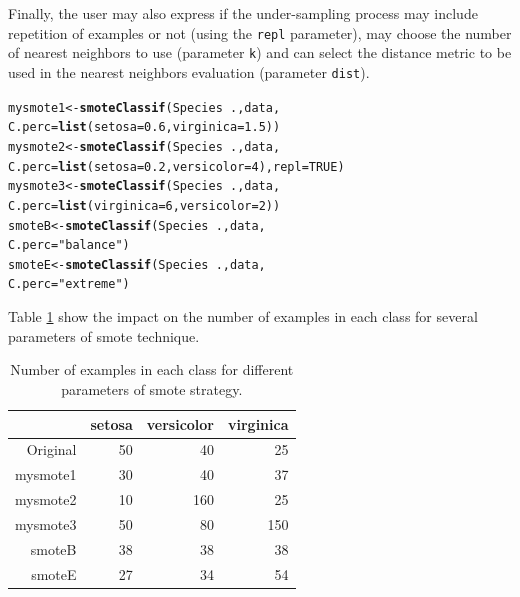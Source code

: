 \documentclass[10pt,a4paper]{article}\usepackage[]{graphicx}\usepackage[]{color}
\makeatletter
\newcommand{\hlnum}[1]{\textcolor[rgb]{0.686,0.059,0.569}{#1}}%
\newcommand{\hlstr}[1]{\textcolor[rgb]{0.192,0.494,0.8}{#1}}%
\newcommand{\hlopt}[1]{\textcolor[rgb]{0,0,0}{#1}}%
\newcommand{\hlstd}[1]{\textcolor[rgb]{0.345,0.345,0.345}{#1}}%
\newcommand{\hlkwb}[1]{\textcolor[rgb]{0.69,0.353,0.396}{#1}}%
\newcommand{\hlkwc}[1]{\textcolor[rgb]{0.333,0.667,0.333}{#1}}%
\newcommand{\hlkwd}[1]{\textcolor[rgb]{0.737,0.353,0.396}{\textbf{#1}}}%
\newenvironment{kframe}{%
 \def\at@end@of@kframe{}%
 \ifinner\ifhmode%
  \def\at@end@of@kframe{\end{minipage}}%
  \begin{minipage}{\columnwidth}%
 \fi\fi%
 \def\FrameCommand##1{\hskip\@totalleftmargin \hskip-\fboxsep
 \colorbox{shadecolor}{##1}\hskip-\fboxsep
     \hskip-\linewidth \hskip-\@totalleftmargin \hskip\columnwidth}%
 \MakeFramed {\advance\hsize-\width
   \@totalleftmargin\z@ \linewidth\hsize
   \@setminipage}}%
 {\par\unskip\endMakeFramed%
 \at@end@of@kframe}
\newenvironment{knitrout}{}{} %
\makeatother
\begin{document}
Finally, the user may also express if the under-sampling process may include repetition of examples or not (using the \texttt{repl} parameter), may choose the number of nearest neighbors to use (parameter \texttt{k}) and can select the distance metric to be used in the nearest neighbors evaluation (parameter \texttt{dist}). 


\begin{knitrout}\footnotesize
{}\color{fgcolor}\begin{kframe}
\begin{alltt}
  \hlstd{mysmote1} \hlkwb{<-} \hlkwd{smoteClassif}\hlstd{(Species}\hlopt{~}\hlstd{., data,}
                           \hlkwc{C.perc}\hlstd{=}\hlkwd{list}\hlstd{(}\hlkwc{setosa}\hlstd{=}\hlnum{0.6}\hlstd{,} \hlkwc{virginica}\hlstd{=}\hlnum{1.5}\hlstd{))}
  \hlstd{mysmote2} \hlkwb{<-} \hlkwd{smoteClassif}\hlstd{(Species}\hlopt{~}\hlstd{., data,}
                           \hlkwc{C.perc}\hlstd{=}\hlkwd{list}\hlstd{(}\hlkwc{setosa}\hlstd{=}\hlnum{0.2}\hlstd{,} \hlkwc{versicolor}\hlstd{=}\hlnum{4}\hlstd{),} \hlkwc{repl}\hlstd{=}\hlnum{TRUE}\hlstd{)}
  \hlstd{mysmote3} \hlkwb{<-} \hlkwd{smoteClassif}\hlstd{(Species}\hlopt{~}\hlstd{., data,}
                           \hlkwc{C.perc}\hlstd{=}\hlkwd{list}\hlstd{(}\hlkwc{virginica}\hlstd{=}\hlnum{6}\hlstd{,} \hlkwc{versicolor}\hlstd{=}\hlnum{2}\hlstd{))}
  \hlstd{smoteB} \hlkwb{<-} \hlkwd{smoteClassif}\hlstd{(Species}\hlopt{~}\hlstd{., data,}
                           \hlkwc{C.perc}\hlstd{=}\hlstr{"balance"}\hlstd{)}
  \hlstd{smoteE} \hlkwb{<-} \hlkwd{smoteClassif}\hlstd{(Species}\hlopt{~}\hlstd{., data,}
                           \hlkwc{C.perc}\hlstd{=}\hlstr{"extreme"}\hlstd{)}
\end{alltt}
\end{kframe}
\end{knitrout}


Table \ref{tab:iris_smote_table} show the impact on the number of examples in each class for several parameters of smote technique.

\begin{table}[ht]
\centering
\begin{tabular}{rrrr}
  \hline
 & setosa & versicolor & virginica \\ 
  \hline
Original &  50 &  40 &  25 \\ 
  mysmote1 &  30 &  40 &  37 \\ 
  mysmote2 &  10 & 160 &  25 \\ 
  mysmote3 &  50 &  80 & 150 \\ 
  smoteB &  38 &  38 &  38 \\ 
  smoteE &  27 &  34 &  54 \\ 
   \hline
\end{tabular}
\caption{Number of examples in each class for different parameters of smote strategy.} 
\label{tab:iris_smote_table}
\end{table}
\end{document}

